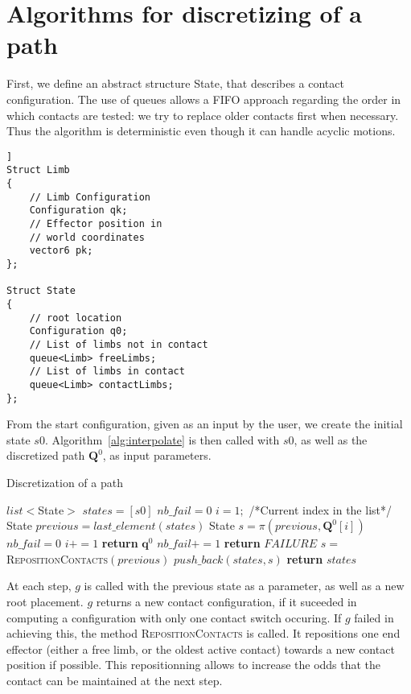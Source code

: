 \section{Algorithms for discretizing of a path}
\label{app:contact}


First, we define an abstract structure State,
that describes a contact configuration.
The use of queues allows a FIFO approach regarding the order 
in which contacts are tested: we try to replace older contacts first when necessary.
Thus the algorithm is deterministic even though it can handle acyclic motions.

\begin{lstlisting}]
Struct Limb
{
    // Limb Configuration
    Configuration qk;
    // Effector position in
    // world coordinates
    vector6 pk;
};

Struct State
{
    // root location
    Configuration q0;
    // List of limbs not in contact
    queue<Limb> freeLimbs;
    // List of limbs in contact
    queue<Limb> contactLimbs;
};
\end{lstlisting}

From the start configuration, given as an input by the user,
we create the initial state $s0$.
Algorithm~\ref{alg:interpolate}  is then called with $s0$, as well as the discretized path 
$\mathbf{Q}^0$, as input parameters.

\begin{algorithm}
\caption{Discretization of a path} \label{interpolate}
	\begin{algorithmic}[1]
		\State $list<$State$>$ $states = [s0]$
		\State $nb\_fail = 0$ 
		\State $i = 1;$ /*Current index in the list*/
			\State State $previous = last\_element(states)$
			\State State $s = \pi(previous, \mathbf{Q}^0[i])$
				\State $nb\_fail = 0$
				\State $i += 1$
				\State \textbf{return} $\mathbf{q}^{0}$
			\Else
				\State $nb\_fail += 1$
					\State \textbf{return} $FAILURE$
				\EndIf				
				\State $s = $\textsc{RepositionContacts}$(previous)$
			\EndIf
			\State $push\_back(states, s)$
		\EndWhile
		\State \textbf{return} $states$
	\EndFunction
\end{algorithmic}
\label{alg:interpolate}
\end{algorithm}

At each step, $g$ is called with the previous state as a parameter, as well
as a new root placement. $g$ returns a new contact configuration, if it suceeded
in computing a configuration with only one contact switch occuring.
If $g$ failed in achieving this, the method \textsc{RepositionContacts} is called.
It repositions one end effector (either a free limb, or the oldest active contact) towards a new contact position if possible.
This repositionning allows to increase the odds that the contact can be maintained at the next step.

